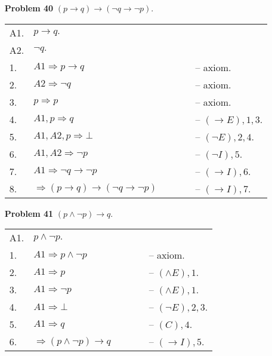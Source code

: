 \begin{enumerate}
\begin{table}[H]
\begin{center}
\begin{tabular}{llll}
\end{tabular}
\end{center}
\end{table}
\newpage


\item[\textbf{Problem 40}] $(p \rightarrow q) \rightarrow (\neg q \rightarrow \neg p)$.
\begin{table}[H]
\begin{center}
\begin{tabular}{llll}
A1. & $p \rightarrow q.$                           & $\qquad$ & \\
A2. & $\neg q.$                                    & $\qquad$ & \\
1.  & $A1 \Rightarrow p \rightarrow q$             & $\qquad$ & -- axiom. \\
2.  & $A2 \Rightarrow \neg q$                      & $\qquad$ & -- axiom. \\
3.  & $p \Rightarrow p$                            & $\qquad$ & -- axiom. \\
4.  & $A1, p \Rightarrow q$                        & $\qquad$ & -- $(\rightarrow E), 1, 3$. \\
5.  & $A1, A2,p \Rightarrow \bot$                  & $\qquad$ & -- $(\neg E), 2, 4$. \\
6.  & $A1, A2 \Rightarrow \neg p$                  & $\qquad$ & -- $(\neg I), 5$. \\
7.  & $A1 \Rightarrow \neg q \rightarrow \neg p$   & $\qquad$ & -- $(\rightarrow I), 6$.   \\
8.  & $\Rightarrow (p \rightarrow q) \rightarrow (\neg q \rightarrow \neg p)$ & $\qquad$ & -- $(\rightarrow I), 7.$   
\end{tabular}
\end{center}
\end{table}

\item[\textbf{Problem 41}] $(p \wedge \neg p) \rightarrow q$.
\begin{table}[H]
\begin{center}
\begin{tabular}{llll}
A1. & $p \wedge \neg p.$                             & $\qquad$ & \\
1.  & $A1 \Rightarrow p \wedge \neg p$               & $\qquad$ & -- axiom. \\
2.  & $A1 \Rightarrow p$                             & $\qquad$ & -- $(\wedge E), 1$. \\
3.  & $A1 \Rightarrow \neg p$                        & $\qquad$ & -- $(\wedge E), 1$. \\
4.  & $A1 \Rightarrow \bot $                         & $\qquad$ & -- $(\neg E), 2, 3$. \\
5.  & $A1 \Rightarrow q $                            & $\qquad$ & -- $(C), 4$. \\
6.  & $\Rightarrow (p \wedge \neg p) \rightarrow q$  & $\qquad$ & -- $(\rightarrow I), 5.$   
\end{tabular}
\end{center}
\end{table}


\end{enumerate}
